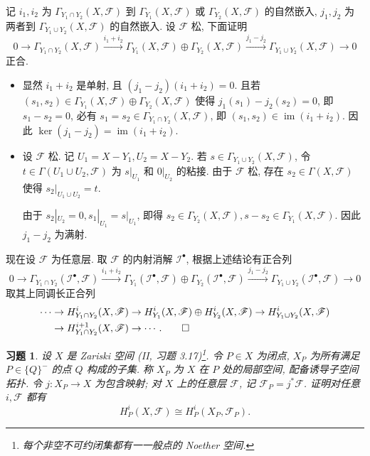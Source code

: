\documentclass{article}
\theoremstyle{exercise}
\newtheorem{exercise}{习题}[section]
\theoremstyle{plain}
\theoremstyle{remark}
\newenvironment{proofc}{\proof}{\endproof}
\def\printfootnotes{}
\def\cF{\mathscr{F}}
\def\cI{\mathscr{I}}
\def\im{\operatorname{im}}
\def\clearfootnotes{}
\begin{document}
\begin{proofc}
  记 $i_1, i_2$ 为 $\Gamma_{Y_1 \cap Y_2}(X, \cF)$ 到
  $\Gamma_{Y_1}(X, \cF)$ 或 $\Gamma_{Y_2}(X, \cF)$ 的自然嵌入,
  $j_1, j_2$ 为两者到 $\Gamma_{Y_1 \cup Y_2}(X, \cF)$ 的自然嵌入.
  设 $\cF$ 松, 下面证明
  \[
    0 \to \Gamma_{Y_1 \cap Y_2}(X, \cF)
    \xrightarrow{i_1 + i_2} \Gamma_{Y_1}(X, \cF) \oplus \Gamma_{Y_2}(X, \cF)
    \xrightarrow{j_1 - j_2} \Gamma_{Y_1 \cup Y_2}(X, \cF) \to 0
  \]
  正合.

  \begin{itemize}
    \item 显然 $i_1 + i_2$ 是单射, 且 $(j_1 - j_2)(i_1 + i_2) = 0$.
          且若 $(s_1, s_2) \in \Gamma_{Y_1}(X, \cF) \oplus \Gamma_{Y_2}(X, \cF)$
          使得 $j_1(s_1) - j_2(s_2) = 0$, 即 $s_1 - s_2 = 0$,
          必有 $s_1 = s_2 \in \Gamma_{Y_1 \cap Y_2}(X, \cF)$,
          即 $(s_1, s_2) \in \im(i_1 + i_2)$.
          因此 $\ker(j_1 - j_2) = \im(i_1 + i_2)$.
    \item 设 $\cF$ 松. 记 $U_1 = X - Y_1, U_2 = X - Y_2$.
          若 $s \in \Gamma_{Y_1 \cup Y_2}(X, \cF)$,
          令 $t \in \Gamma(U_1 \cup U_2, \cF)$
          为 $s|_{U_1}$ 和 $0|_{U_2}$ 的粘接.
          由于 $\cF$ 松, 存在 $s_2 \in \Gamma(X, \cF)$
          使得 $s_2|_{U_1 \cup U_2} = t$.

          由于 $s_2|_{U_2} = 0, s_1|_{U_1} = s|_{U_1}$,
          即得 $s_2 \in \Gamma_{Y_2}(X, \cF), s - s_2 \in \Gamma_{Y_1}(X, \cF)$.
          因此 $j_1 - j_2$ 为满射.
  \end{itemize}

  现在设 $\cF$ 为任意层. 取 $\cF$ 的内射消解 $\cI^\bullet$, 根据上述结论有正合列
  \[
    0 \to \Gamma_{Y_1 \cap Y_2}(\cI^\bullet, \cF)
    \xrightarrow{i_1 + i_2} \Gamma_{Y_1}(\cI^\bullet, \cF) \oplus \Gamma_{Y_2}(\cI^\bullet, \cF)
    \xrightarrow{j_1 - j_2} \Gamma_{Y_1 \cup Y_2}(\cI^\bullet, \cF) \to 0
  \]
  取其上同调长正合列
    \begin{align*}
      \cdots & \to H^i_{Y_1 \cap Y_2}(X, \cF)
               \to H^i_{Y_1}(X, \cF) \oplus H^i_{Y_2}(X, \cF)
               \to H^i_{Y_1 \cup Y_2}(X, \cF) \\
             & \to H^{i+1}_{Y_1 \cap Y_2}(X, \cF) \to \cdots.
    \qedhere
    \end{align*}
\end{proofc}

\begin{exercise}
  设 $X$ 是 Zariski 空间 (II, 习题 3.17)\footnote{每个非空不可约闭集都有一一般点的 Noether 空间.}.
  令 $P \in X$ 为闭点, $X_P$ 为所有满足 $P \in \{Q\}^-$ 的点 $Q$ 构成的子集.
  称 $X_P$ 为 $X$ 在 $P$ 处的\emph{局部空间}, 配备诱导子空间拓扑.
  令 $j \colon X_P \to X$ 为包含映射; 对 $X$ 上的任意层 $\cF$, 记 $\cF_P = j^* \cF$.
  证明对任意 $i, \cF$ 都有
  \[
    H_P^i(X, \cF) \cong H_P^i(X_P, \cF_P).
  \]
\end{exercise}
\printfootnotes
\clearfootnotes
\end{document}
